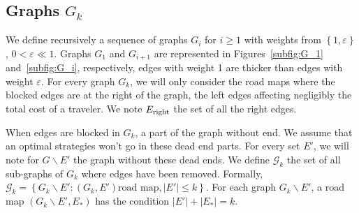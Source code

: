 \documentclass[11pt,letterpaper]{article}
\newcommand{\set}[1]{\left\{ #1 \right\}}
\newcommand{\card}[1]{\left| #1 \right|}
\newcommand{\mcalg}{\mathcal{G}}
\begin{document}
\subsection{Graphs $G_k$}

We define recursively a sequence of graphs $G_i$ for $i \geq 1$ with weights from $\set{1,\varepsilon}$, $0 < \varepsilon \ll 1$. Graphs $G_1$ and $G_{i+1}$ are represented in Figures~\ref{subfig:G_1} and~\ref{subfig:G_i}, respectively, edges with weight 1 are thicker than edges with weight $\varepsilon$. For every graph $G_k$, we will only consider the road maps where the blocked edges are at the right of the graph, the left edges affecting negligibly the total cost of a traveler. We note $E_{\mbox{\scriptsize{right}}}$ the set of all the right edges.

When edges are blocked in $G_k$, a part of the graph without end. We assume that an optimal strategies won't go in these dead end parts. For every set $E'$, we will note for $G\backslash E'$ the graph without these dead ends. We define $\mcalg_k$ the set of all sub-graphs of $G_k$ where edges have been removed. Formally, $\mcalg_k = \set{G_k\backslash E' : \left(G_k,E'\right) \mbox{road map}, \card{E'} \leq k}$. For each graph $G_k\backslash E'$, a road map $\left(G_k\backslash E',E_*\right)$ has the condition $\card{E'} + \card{E_*} = k$.
\end{document}
